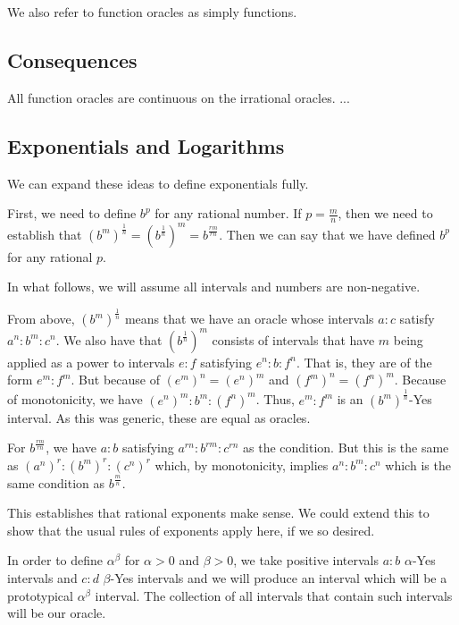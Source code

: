 \documentclass[12pt]{article}
\theoremstyle{remark}
\begin{document}
We also refer to function oracles as simply functions. 

\subsection{Consequences}

All function oracles are continuous on the irrational oracles. ...





\subsection{Exponentials and Logarithms}

We can expand these ideas to define exponentials fully. 

First, we need to define $b^p$ for any rational number. If $p=\frac{m}{n}$, then we need to establish that $(b^m)^{\frac{1}{n}} = (b^{\frac{1}{n}})^m = b^{\frac{rm}{rn}}$. Then we can say that we have defined $b^p$ for any rational $p$. 

In what follows, we will assume all intervals and numbers are non-negative.

From above, $(b^m)^{\frac{1}{n}}$ means that we have an oracle whose intervals $a:c$ satisfy $a^n : b^m : c^n$. We also have that $(b^{\frac{1}{n}})^m$ consists of intervals that have $m$ being applied as a power to intervals  $e:f$ satisfying $e^n : b : f^n$. That is, they are of the form $e^m:f^m$. But because of $(e^m)^n = (e^n)^m$ and $(f^m)^n = (f^n)^m$. Because of monotonicity, we have $(e^n)^m : b^m : (f^n)^m $. Thus, $e^m:f^m$ is an $(b^m)^{\frac{1}{n}}$-Yes interval. As this was generic, these are equal as oracles. 

For $b^{\frac{rm}{rn}}$, we have $a:b$ satisfying $a^{rn}:b^{rm}:c^{rn}$ as the condition. But this is the same as $(a^n)^r : (b^m)^r : (c^n)^r$ which, by monotonicity, implies $a^n : b^m : c^n$ which is the same condition as $b^{\frac{m}{n}}$.

This establishes that rational exponents make sense. We could extend this to show that the usual rules of exponents apply here, if we so desired. 

In order to define $\alpha^\beta$ for $\alpha > 0$ and $\beta > 0$, we take positive intervals $a:b$ $\alpha$-Yes intervals and $c:d$ $\beta$-Yes intervals and we will produce an interval which will be a prototypical $\alpha^\beta$ interval. The collection of all intervals that contain such intervals will be our oracle. 
\end{document}
